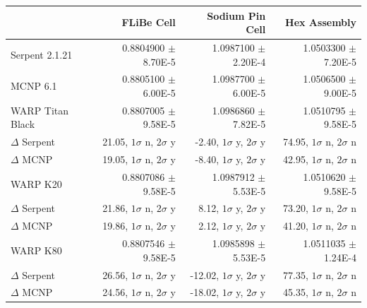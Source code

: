 \documentclass[preprint,12pt]{elsarticle}
\begin{document}
\begin{table}[h]
\smallskip

\begin{tabular}{| l | r | r | r |}
\cline{2-4}
\multicolumn{1}{c|}{}               & FLiBe Cell                      & Sodium Pin Cell                  & Hex Assembly                      \\
\hline                       
Serpent 2.1.21                      & 0.8804900 $\pm$ 8.70E-5         & 1.0987100 $\pm$ 2.20E-4          & 1.0503300 $\pm$ 7.20E-5           \\
\hline                       
MCNP 6.1                            & 0.8805100 $\pm$ 6.00E-5         & 1.0987700 $\pm$ 6.00E-5          & 1.0506500 $\pm$ 9.00E-5           \\
\hline                       
WARP Titan Black                    & 0.8807005 $\pm$ 9.58E-5         & 1.0986860 $\pm$ 7.82E-5          & 1.0510795 $\pm$ 9.58E-5           \\
    \qquad\qquad   $\Delta$ Serpent & 21.05, $1\sigma$ n, $2\sigma$ y & -2.40, $1\sigma$ y, $2\sigma$ y  &  74.95, $1\sigma$ n, $2\sigma$ n  \\
    \qquad\qquad   $\Delta$ MCNP    & 19.05, $1\sigma$ n, $2\sigma$ y & -8.40, $1\sigma$ y, $2\sigma$ y  &  42.95, $1\sigma$ n, $2\sigma$ n  \\
\hline
WARP K20                            & 0.8807086 $\pm$ 9.58E-5         & 1.0987912 $\pm$ 5.53E-5          & 1.0510620 $\pm$ 9.58E-5           \\
    \qquad\qquad   $\Delta$ Serpent & 21.86, $1\sigma$ n, $2\sigma$ y & 8.12, $1\sigma$ y, $2\sigma$ y   &  73.20, $1\sigma$ n, $2\sigma$ n  \\
    \qquad\qquad   $\Delta$ MCNP    & 19.86, $1\sigma$ n, $2\sigma$ y & 2.12, $1\sigma$ y, $2\sigma$ y   &  41.20, $1\sigma$ n, $2\sigma$ n  \\
\hline
WARP K80                            & 0.8807546 $\pm$ 9.58E-5         & 1.0985898 $\pm$ 5.53E-5          & 1.0511035 $\pm$ 1.24E-4          \\
    \qquad\qquad   $\Delta$ Serpent & 26.56, $1\sigma$ n, $2\sigma$ y & -12.02, $1\sigma$ y, $2\sigma$ y &  77.35, $1\sigma$ n, $2\sigma$ n  \\
    \qquad\qquad   $\Delta$ MCNP    & 24.56, $1\sigma$ n, $2\sigma$ y & -18.02, $1\sigma$ y, $2\sigma$ y &  45.35, $1\sigma$ n, $2\sigma$ n  \\
\hline
\end{tabular}
\end{table}
\end{document}
